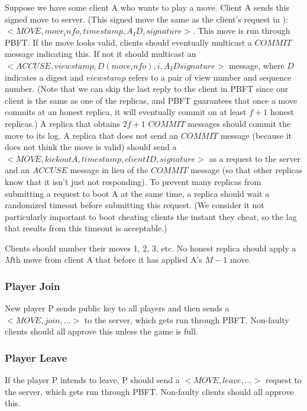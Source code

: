 \documentclass[11pt]{article}
\begin{document}
\begin{multicols}{2}
Suppose we have some client A who wants to play a move. Client A sends this signed move to server. (This signed move the same as the client’s request in \cite{castro}): $<MOVE, move_info, timestamp, A_ID, signature>$. This move is run through PBFT. If the move looks valid, clients should eventually multicast a $COMMIT$ message indicating this. If not it should multicast an $<ACCUSE, viewstamp, D(move_info), i, A_ID signature>$ message, where $D$ indicates a digest and $viewstamp$ refers to a pair of view number and sequence number. (Note that we can skip the last reply to the client in PBFT since our client is the same as one of the replicas, and PBFT guarantees that once a move commits at an honest replica, it will eventually commit on at least $f+1$ honest replicas.) A replica that obtains $2f+1$ $COMMIT$ messages should commit the move to its log. A replica that does not send an $COMMIT$ message (because it does not think the move is valid) should send a $<MOVE, kick out A, timestamp, clientID, signature>$ as a request to the server and an $ACCUSE$ message in lieu of the $COMMIT$ message (so that other replicas know that it isn’t just not responding). To prevent many replicas from submitting a request to boot A at the same time, a replica should wait a randomized timeout before submitting this request. (We consider it not particularly important to boot cheating clients the instant they cheat, so the lag that results from this timeout is acceptable.) 

Clients should number their moves 1, 2, 3, etc. No honest replica should apply a $M$th move from client A that before it has applied A’s $M-1$ move. 

\subsubsection{Player Join}

New player P sends public key to all players and then sends a $<MOVE, join, ...>$ to the server, which gets run through PBFT. Non-faulty clients should all approve this unless the game is full.

\subsubsection{Player Leave}

If the player P intends to leave, P should send a $<MOVE, leave,...>$ request to the server, which gets run through PBFT. Non-faulty clients should all approve this.


\end{multicols}
\end{document}
